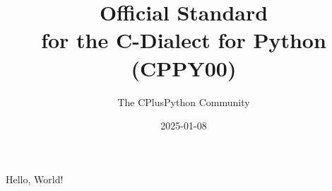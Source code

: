 

\title{
    Official Standard \\
    for the C-Dialect for Python \\
    (CPPY00)
}
\date{ 2025-01-08}
\author{The CPlusPython Community}



Hello, World!
